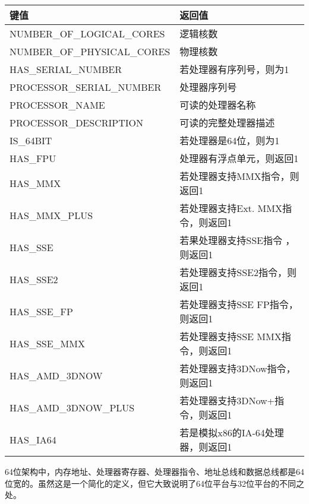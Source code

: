\begin{table}[H]
	\begin{tabular}{|l|l|}
		\hline
		\textbf{键值}                & \textbf{返回值}                          \\ \hline
		NUMBER\_OF\_LOGICAL\_CORES  & 逻辑核数                      \\ \hline
		NUMBER\_OF\_PHYSICAL\_CORES & 物理核数                     \\ \hline
		HAS\_SERIAL\_NUMBER         & 若处理器有序列号，则为1           \\ \hline
		PROCESSOR\_SERIAL\_NUMBER   & 处理器序列号                      \\ \hline
		PROCESSOR\_NAME             & 可读的处理器名称                \\ \hline
		PROCESSOR\_DESCRIPTION      & 可读的完整处理器描述    \\ \hline
		IS\_64BIT                   & 若处理器是64位，则为1                     \\ \hline
		HAS\_FPU                    & 处理器有浮点单元，则返回1     \\ \hline
		HAS\_MMX                    & 若处理器支持MMX指令，则返回1     \\ \hline
		HAS\_MMX\_PLUS              & 若处理器支持Ext. MMX指令，则返回1 \\ \hline
		HAS\_SSE                    & 若果处理器支持SSE指令 ，则返回1     \\ \hline
		HAS\_SSE2                   & 若处理器支持SSE2指令，则返回1     \\ \hline
		HAS\_SSE\_FP                & 若处理器支持SSE FP指令，则返回1   \\ \hline
		HAS\_SSE\_MMX               & 若处理器支持SSE MMX指令，则返回1  \\ \hline
		HAS\_AMD\_3DNOW             & 若处理器支持3DNow指令，则返回1    \\ \hline
		HAS\_AMD\_3DNOW\_PLUS       & 若处理器支持3DNow+指令，则返回1   \\ \hline
		HAS\_IA64                   & 若是模拟x86的IA-64处理器，则返回1      \\ \hline
	\end{tabular}
\end{table}


64位架构中，内存地址、处理器寄存器、处理器指令、地址总线和数据总线都是64位宽的。虽然这是一个简化的定义，但它大致说明了64位平台与32位平台的不同之处。

